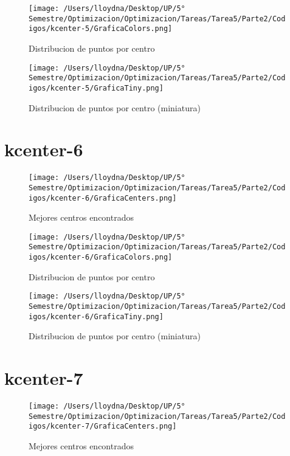 \documentclass{report}
\begin{document}
        \begin{figure}[H]
            \texttt{[image: /Users/lloydna/Desktop/UP/5° Semestre/Optimizacion/Optimizacion/Tareas/Tarea5/Parte2/Codigos/kcenter-5/GraficaColors.png]}
            \caption{Distribucion de puntos por centro}
            \label{fig:kc52}
        \end{figure}

        \begin{figure}[H]
            \texttt{[image: /Users/lloydna/Desktop/UP/5° Semestre/Optimizacion/Optimizacion/Tareas/Tarea5/Parte2/Codigos/kcenter-5/GraficaTiny.png]}
            \caption{Distribucion de puntos por centro (miniatura)}
            \label{fig:kc53}
        \end{figure}

    \pagebreak

    \section{kcenter-6}
        \begin{figure}[H]
            \texttt{[image: /Users/lloydna/Desktop/UP/5° Semestre/Optimizacion/Optimizacion/Tareas/Tarea5/Parte2/Codigos/kcenter-6/GraficaCenters.png]}
            \caption{Mejores centros encontrados}
            \label{fig:kc61}
        \end{figure}

        \begin{figure}[H]
            \texttt{[image: /Users/lloydna/Desktop/UP/5° Semestre/Optimizacion/Optimizacion/Tareas/Tarea5/Parte2/Codigos/kcenter-6/GraficaColors.png]}
            \caption{Distribucion de puntos por centro}
            \label{fig:kc62}
        \end{figure}

        \begin{figure}[H]
            \texttt{[image: /Users/lloydna/Desktop/UP/5° Semestre/Optimizacion/Optimizacion/Tareas/Tarea5/Parte2/Codigos/kcenter-6/GraficaTiny.png]}
            \caption{Distribucion de puntos por centro (miniatura)}
            \label{fig:kc63}
        \end{figure}

    \pagebreak

    \section{kcenter-7}
        \begin{figure}[H]
            \texttt{[image: /Users/lloydna/Desktop/UP/5° Semestre/Optimizacion/Optimizacion/Tareas/Tarea5/Parte2/Codigos/kcenter-7/GraficaCenters.png]}
            \caption{Mejores centros encontrados}
            \label{fig:kc71}
        \end{figure}
\end{document}
